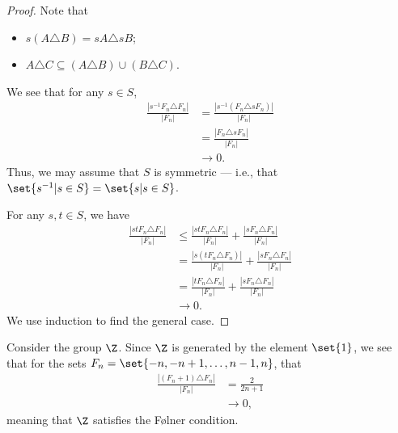 \begin{proof}
  Note that
  \begin{itemize}
    \item $s\left(A\triangle B\right) = sA\triangle sB$;
    \item $A\triangle C \subseteq \left(A\triangle B\right) \cup \left(B\triangle C\right)$.
  \end{itemize}
  We see that for any $s\in S$,
  \begin{align*}
    \frac{\left\vert s^{-1}F_n\triangle F_n \right\vert}{\left\vert F_n \right\vert} &= \frac{\left\vert s^{-1}\left(F_n\triangle sF_n\right) \right\vert}{\left\vert F_n \right\vert}\\
                                                                                     &= \frac{\left\vert F_n\triangle sF_n \right\vert}{\left\vert F_n \right\vert}\\
                                                                                     &\rightarrow 0.
  \end{align*}
  Thus, we may assume that $S$ is symmetric --- i.e., that $\set{s^{-1}| s\in S} = \set{s | s\in S}$.\newline

  For any $s,t\in S$, we have
  \begin{align*}
    \frac{\left\vert stF_n\triangle F_n \right\vert}{\left\vert F_n \right\vert} &\leq \frac{\left\vert stF_n\triangle F_n \right\vert}{\left\vert F_n \right\vert} + \frac{\left\vert sF_n\triangle F_n \right\vert}{\left\vert F_n \right\vert}\\
                                                                                 &= \frac{\left\vert s\left(tF_n\triangle F_n\right) \right\vert}{\left\vert F_n \right\vert} + \frac{\left\vert sF_n\triangle F_n \right\vert}{\left\vert F_n \right\vert}\\
                                                                                 &= \frac{\left\vert tF_n\triangle F_n \right\vert}{\left\vert F_n \right\vert} + \frac{\left\vert sF_n\triangle F_n \right\vert}{\left\vert F_n \right\vert}\\
                                                                                 &\rightarrow 0.
  \end{align*}
  We use induction to find the general case.
\end{proof}
\begin{example}
  Consider the group $\Z$. Since $\Z$ is generated by the element $\set{1}$, we see that for the sets $F_n = \set{-n,-n+1,\dots,n-1,n}$, that
  \begin{align*}
    \frac{\left\vert \left(F_n + 1\right)\triangle F_n \right\vert}{\left\vert F_n \right\vert} &= \frac{2}{2n+1}\\
                                                                                                &\rightarrow 0,
  \end{align*}
  meaning that $\Z$ satisfies the Følner condition.
\end{example}
